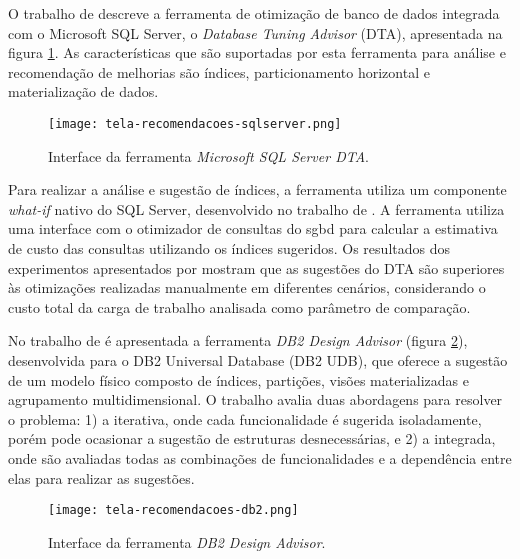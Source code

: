 O trabalho de \textbf{\citet{Agrawal:2004}} descreve a ferramenta de otimização de banco de dados integrada com o Microsoft SQL Server, o \emph{Database Tuning Advisor} (DTA), apresentada na figura \ref{fig:tela-recomendacoes-sqlserver}. As características que são suportadas por esta ferramenta para análise e recomendação de melhorias são índices, particionamento horizontal e materialização de dados.

\begin{figure}[H]
  \centering
  \caption{Interface da ferramenta \emph{Microsoft SQL Server DTA}.}
  \texttt{[image: tela-recomendacoes-sqlserver.png]}
  \label{fig:tela-recomendacoes-sqlserver}
\end{figure}

Para realizar a análise e sugestão de índices, a ferramenta utiliza um componente \emph{what-if} nativo do SQL Server, desenvolvido no trabalho de \citet{Chaudhuri:1998}. A ferramenta utiliza uma interface com o otimizador de consultas do \gls{sgbd} para calcular a estimativa de custo das consultas utilizando os índices sugeridos. Os resultados dos experimentos apresentados por \citet{Agrawal:2004} mostram que as sugestões do DTA são superiores às otimizações realizadas manualmente em diferentes cenários, considerando o custo total da carga de trabalho analisada como parâmetro de comparação.

No trabalho de \textbf{\citet{Zilio:2004}} é apresentada a ferramenta \emph{DB2 Design Advisor} (figura \ref{fig:tela-recomendacoes-db2}), desenvolvida para o DB2 Universal Database (DB2 UDB), que oferece a sugestão de um modelo físico composto de índices, partições, visões materializadas e agrupamento multidimensional. O trabalho avalia duas abordagens para resolver o problema: 1) a iterativa, onde cada funcionalidade é sugerida isoladamente, porém pode ocasionar a sugestão de estruturas desnecessárias, e 2) a integrada, onde são avaliadas todas as combinações de funcionalidades e a dependência entre elas para realizar as sugestões.

\begin{figure}[H]
  \centering
  \caption{Interface da ferramenta \emph{DB2 Design Advisor}.}
  \texttt{[image: tela-recomendacoes-db2.png]}
  \label{fig:tela-recomendacoes-db2}
\end{figure}

